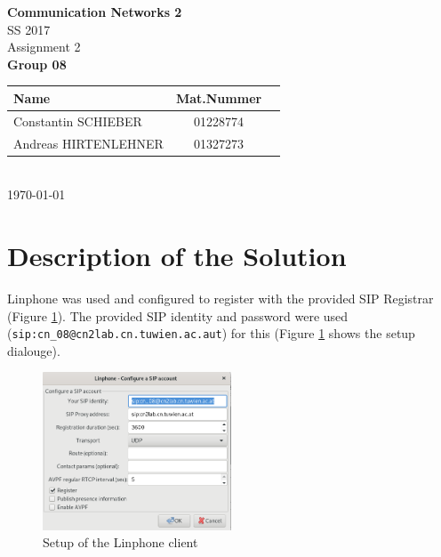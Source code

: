 \documentclass[parskip=full]{scrartcl}
\begin{document}
\begin{titlepage}
    \centering
    \vspace*{2cm}
    {\Huge \textbf{Communication Networks 2}}\\
    SS 2017\\
    \vspace*{1cm}
    {\Large Assignment 2}
    \\\vspace*{3cm}
    {\Large \textbf{Group 08}}\\
    \vspace*{1cm}
    {\large 
        \begin{tabular}{l c c}
            Name & Mat.Nummer \\ \hline
            Constantin SCHIEBER & 01228774 \\
            Andreas HIRTENLEHNER & 01327273
        \end{tabular}
    }
    \\\vspace*{7cm}
    \today
\end{titlepage}

\section{Description of the Solution}
Linphone was used and configured to register with the provided SIP Registrar (Figure \ref{fig:registerLinphone}).
The provided SIP identity and password were used (\texttt{sip:cn\_08@cn2lab.cn.tuwien.ac.aut}) for this (Figure \ref{fig:registerLinphone} shows the setup dialouge).
\begin{figure}[ht]
    \centering
   \includegraphics[width=0.5\textwidth]{images/linphoneSettings.png} 
    \caption{Setup of the Linphone client}
    \label{fig:registerLinphone}
\end{figure}
\end{document}
